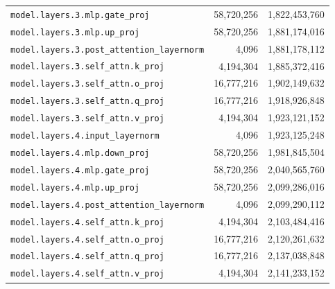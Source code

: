 \documentclass[10pt,a4paper]{article}
\theoremstyle{definition}
\begin{document}
\begin{appendices}
\begin{longtable}{p{9.5cm}rr}
\texttt{model.\allowbreak{}layers.\allowbreak{}3.\allowbreak{}mlp.\allowbreak{}gate\_proj} & 58,720,256 & 1,822,453,760 \\
\texttt{model.\allowbreak{}layers.\allowbreak{}3.\allowbreak{}mlp.\allowbreak{}up\_proj} & 58,720,256 & 1,881,174,016 \\
\texttt{model.\allowbreak{}layers.\allowbreak{}3.\allowbreak{}post\_attention\_layernorm} & 4,096 & 1,881,178,112 \\
\texttt{model.\allowbreak{}layers.\allowbreak{}3.\allowbreak{}self\_attn.\allowbreak{}k\_proj} & 4,194,304 & 1,885,372,416 \\
\texttt{model.\allowbreak{}layers.\allowbreak{}3.\allowbreak{}self\_attn.\allowbreak{}o\_proj} & 16,777,216 & 1,902,149,632 \\
\texttt{model.\allowbreak{}layers.\allowbreak{}3.\allowbreak{}self\_attn.\allowbreak{}q\_proj} & 16,777,216 & 1,918,926,848 \\
\texttt{model.\allowbreak{}layers.\allowbreak{}3.\allowbreak{}self\_attn.\allowbreak{}v\_proj} & 4,194,304 & 1,923,121,152 \\
\texttt{model.\allowbreak{}layers.\allowbreak{}4.\allowbreak{}input\_layernorm} & 4,096 & 1,923,125,248 \\
\texttt{model.\allowbreak{}layers.\allowbreak{}4.\allowbreak{}mlp.\allowbreak{}down\_proj} & 58,720,256 & 1,981,845,504 \\
\texttt{model.\allowbreak{}layers.\allowbreak{}4.\allowbreak{}mlp.\allowbreak{}gate\_proj} & 58,720,256 & 2,040,565,760 \\
\texttt{model.\allowbreak{}layers.\allowbreak{}4.\allowbreak{}mlp.\allowbreak{}up\_proj} & 58,720,256 & 2,099,286,016 \\
\texttt{model.\allowbreak{}layers.\allowbreak{}4.\allowbreak{}post\_attention\_layernorm} & 4,096 & 2,099,290,112 \\
\texttt{model.\allowbreak{}layers.\allowbreak{}4.\allowbreak{}self\_attn.\allowbreak{}k\_proj} & 4,194,304 & 2,103,484,416 \\
\texttt{model.\allowbreak{}layers.\allowbreak{}4.\allowbreak{}self\_attn.\allowbreak{}o\_proj} & 16,777,216 & 2,120,261,632 \\
\texttt{model.\allowbreak{}layers.\allowbreak{}4.\allowbreak{}self\_attn.\allowbreak{}q\_proj} & 16,777,216 & 2,137,038,848 \\
\texttt{model.\allowbreak{}layers.\allowbreak{}4.\allowbreak{}self\_attn.\allowbreak{}v\_proj} & 4,194,304 & 2,141,233,152 \\

\end{longtable}
\end{appendices}
\end{document}
